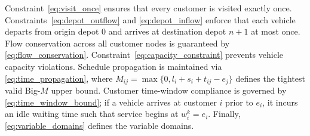 Constraint~\eqref{eq:visit_once} ensures that every customer is visited exactly once. Constraints~\eqref{eq:depot_outflow} and \eqref{eq:depot_inflow} enforce that each vehicle departs from origin depot $0$ and arrives at destination depot $n+1$ at most once. Flow conservation across all customer nodes is guaranteed by \eqref{eq:flow_conservation}. Constraint~\eqref{eq:capacity_constraint} prevents vehicle capacity violations. Schedule propagation is maintained via \eqref{eq:time_propagation}, where $M_{ij} = \max\{0, l_i + s_i + t_{ij} - e_j\}$ defines the tightest valid Big-$M$ upper bound. Customer time-window compliance is governed by \eqref{eq:time_window_bound}; if a vehicle arrives at customer $i$ prior to $e_i$, it incurs an idle waiting time such that service begins at $w_i^k = e_i$. Finally, \eqref{eq:variable_domains} defines the variable domains.
